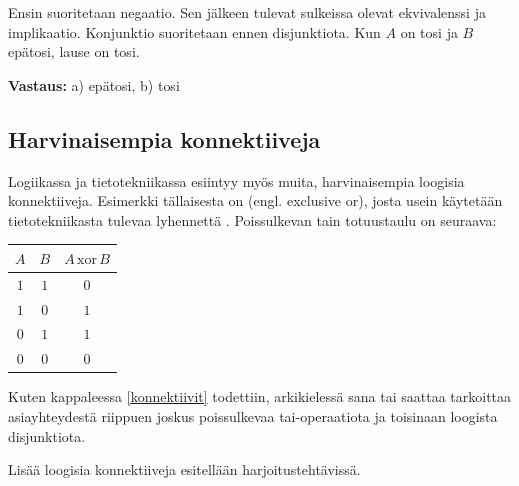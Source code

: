 \begin{esimerkki}
Ensin suoritetaan negaatio. Sen jälkeen tulevat sulkeissa olevat ekvivalenssi ja implikaatio. Konjunktio suoritetaan ennen disjunktiota. Kun $A$ on tosi ja $B$ epätosi, lause on tosi.

{\bf Vastaus:} a) epätosi, b) tosi
\end{esimerkki}

\subsection*{Harvinaisempia konnektiiveja}%
Logiikassa ja tietotekniikassa esiintyy myös muita, harvinaisempia loogisia konnektiiveja. Esimerkki tällaisesta on  (engl. exclusive or), josta usein käytetään tietotekniikasta tulevaa lyhennettä . Poissulkevan tain totuustaulu on seuraava:

\bigskip

\begin{center}
\begin{tabular}{|c|c|c|}\hline
$A$ & $B$ & $A\,\mathrm{xor}\,B$ \\ \hline
$1$ & $1$ & $0$\\ %
$1$ & $0$ & $1$\\
$0$ & $1$ & $1$\\
$0$ & $0$ & $0$\\ \hline
\end{tabular}
\end{center}

\bigskip

Kuten kappaleessa \ref{konnektiivit} todettiin, arkikielessä sana tai saattaa tarkoittaa asiayhteydestä riippuen joskus poissulkevaa tai-operaatiota ja toisinaan loogista disjunktiota.

Lisää loogisia konnektiiveja esitellään harjoitustehtävissä.




\Harjoitustehtavat

